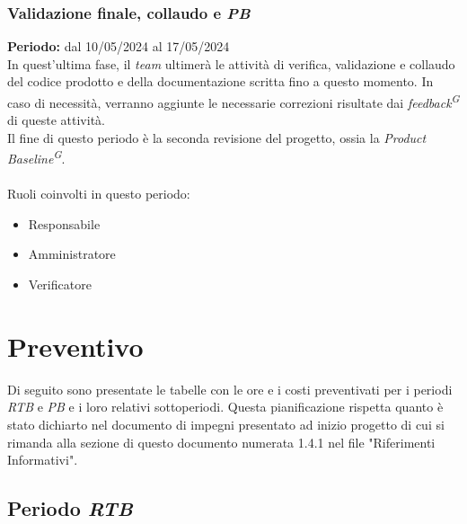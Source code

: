 \documentclass[5pt]{article}
\begin{document}
    \subsubsection{Validazione finale, collaudo e \textit{PB}}
      \textbf{Periodo:} dal 10/05/2024 al 17/05/2024 
      \vspace{0.3cm}\\
      In quest'ultima fase, il \textit{team} ultimerà le attività di verifica, validazione e collaudo del codice prodotto e della documentazione scritta fino a questo momento.
      In caso di necessità, verranno aggiunte le necessarie correzioni risultate dai \textit{feedback\textsuperscript{G}} di queste attività. \\
      Il fine di questo periodo è la seconda revisione del progetto, ossia la \textit{Product Baseline\textsuperscript{G}}.\\\\
      Ruoli coinvolti in questo periodo:
      \begin{itemize}
          \item Responsabile
          \item Amministratore
          \item Verificatore
      \end{itemize}

\section{Preventivo}
  Di seguito sono presentate le tabelle con le ore e i costi preventivati per i periodi \textit{RTB} e \textit{PB} e i loro relativi sottoperiodi.
  Questa pianificazione rispetta quanto è stato dichiarto nel documento di impegni presentato ad inizio progetto di cui si rimanda alla sezione di questo documento numerata 1.4.1 nel file "Riferimenti Informativi".

  \subsection{Periodo \textit{RTB}}
\end{document}
